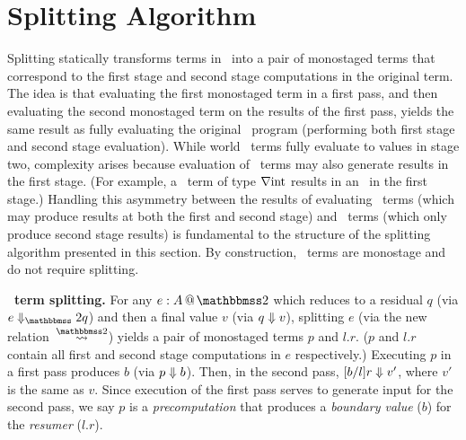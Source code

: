 
\section{Splitting Algorithm}
\label{sec:splitting}

%

\begin{abstrsyn}

Splitting statically transforms terms in \lang\ into a pair of
monostaged terms that correspond to the first stage and second stage
computations in the original term. The idea is that evaluating the
first monostaged term in a first pass, and then evaluating the second
monostaged term on the results of the first pass, yields the same
result as fully evaluating the original \lang\ program (performing
both first stage and second stage evaluation).  While world
\bbtwo\ terms fully evaluate to values in stage two, complexity arises
because evaluation of \bbonem\ terms may also generate results in the
first stage. (For example, a \bbonem\ term of type $\nabla {\rm int}$
results in an \rmint\ in the first stage.) Handling this asymmetry
between the results of evaluating \bbonem\ terms (which may produce
results at both the first and second stage) and \bbtwo\ terms (which
only produce second stage results) is fundamental to the structure of
the splitting algorithm presented in this section.  By construction,
\bbonep\ terms are monostage and do not require splitting.

\textbf{\bbtwo\ term splitting.}  For any $\coltwo e A$ which reduces
to a residual $q$ (via $\diatwo e q$) and then a final value $v$ (via
${q} \Downarrow {v}$), splitting $e$ (via the new relation~$\splittwosym$)
yields a pair of monostaged terms $p$ and $l.r$. ($p$ and $l.r$
contain all first and second stage computations in $e$ respectively.)
Executing $p$ in a first pass produces $b$ (via ${p} \Downarrow {b}$). Then,
in the second pass, ${[b/l]r} \Downarrow {v'}$, where $v'$ is the same as
$v$.  Since execution of the first pass serves to generate input for
the second pass, we say $p$ is a {\em precomputation} that produces a
{\em boundary value} ($b$) for the {\em resumer} ($l.r$).




\end{abstrsyn}
